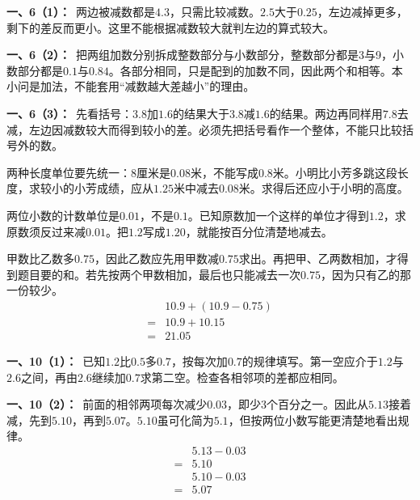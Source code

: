 \documentclass[multi=snippet,border=0pt]{standalone}
\newenvironment{snippet}[3]{\begin{minipage}{#1bp}\color{answerred}\fontsize{#2}{#3}\selectfont\raggedright}{\end{minipage}}
\begin{document}
\begin{snippet}{505}{11.5}{14}\textbf{一、6（1）：}\ 两边被减数都是\(4.3\)，只需比较减数。\(2.5\)大于\(0.25\)，左边减掉更多，剩下的差反而更小。这里不能根据减数较大就判左边的算式较大。\end{snippet}
\begin{snippet}{505}{11.5}{14}\textbf{一、6（2）：}\ 把两组加数分别拆成整数部分与小数部分，整数部分都是3与9，小数部分都是\(0.1\)与\(0.84\)。各部分相同，只是配到的加数不同，因此两个和相等。本小问是加法，不能套用“减数越大差越小”的理由。\end{snippet}
\begin{snippet}{505}{11.5}{14}\textbf{一、6（3）：}\ 先看括号：\(3.8\)加\(1.6\)的结果大于\(3.8\)减\(1.6\)的结果。两边再同样用\(7.8\)去减，左边因减数较大而得到较小的差。必须先把括号看作一个整体，不能只比较括号外的数。\end{snippet}
\begin{snippet}{505}{11.5}{14}两种长度单位要先统一：8厘米是\(0.08\)米，不能写成\(0.8\)米。小明比小芳多跳这段长度，求较小的小芳成绩，应从\(1.25\)米中减去\(0.08\)米。求得后还应小于小明的高度。\end{snippet}
\begin{snippet}{505}{11.5}{14}两位小数的计数单位是\(0.01\)，不是\(0.1\)。已知原数加一个这样的单位才得到\(1.2\)，求原数须反过来减\(0.01\)。把\(1.2\)写成\(1.20\)，就能按百分位清楚地减去。\end{snippet}
\begin{snippet}{505}{11.5}{14}甲数比乙数多\(0.75\)，因此乙数应先用甲数减\(0.75\)求出。再把甲、乙两数相加，才得到题目要的和。若先按两个甲数相加，最后也只能减去一次\(0.75\)，因为只有乙的那一份较少。\[\begin{aligned}&10.9+(10.9-0.75)\\={}&10.9+10.15\\={}&21.05\end{aligned}\]\end{snippet}
\begin{snippet}{505}{11.5}{14}\textbf{一、10（1）：}\ 已知\(1.2\)比\(0.5\)多\(0.7\)，按每次加\(0.7\)的规律填写。第一空应介于\(1.2\)与\(2.6\)之间，再由\(2.6\)继续加\(0.7\)求第二空。检查各相邻项的差都应相同。\end{snippet}
\begin{snippet}{505}{11.5}{14}\textbf{一、10（2）：}\ 前面的相邻两项每次减少\(0.03\)，即少3个百分之一。因此从\(5.13\)接着减，先到\(5.10\)，再到\(5.07\)。\(5.10\)虽可化简为\(5.1\)，但按两位小数写能更清楚地看出规律。\[\begin{aligned}&5.13-0.03\\={}&5.10\\&5.10-0.03\\={}&5.07\end{aligned}\]\end{snippet}
\end{document}
